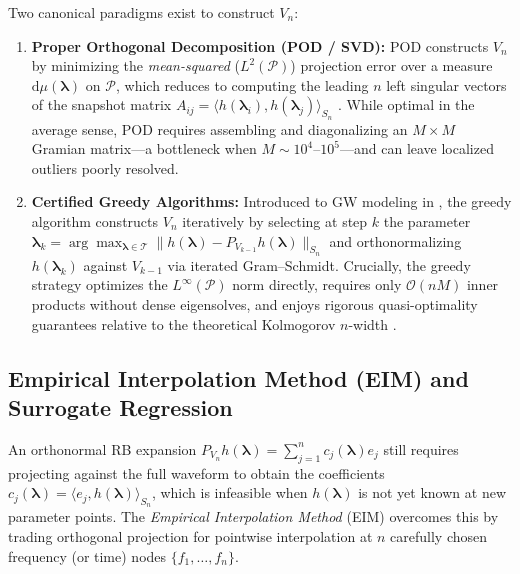 \documentclass[11pt, a4paper]{article}
\begin{document}
Two canonical paradigms exist to construct $V_n$:
\begin{enumerate}
    \item \textbf{Proper Orthogonal Decomposition (POD / SVD):} POD constructs $V_n$ by minimizing the \emph{mean-squared} ($L^2(\mathcal{P})$) projection error over a measure $\mathrm{d}\mu(\boldsymbol{\lambda})$ on $\mathcal{P}$, which reduces to computing the leading $n$ left singular vectors of the snapshot matrix $A_{ij} = \langle h(\boldsymbol{\lambda}_i), h(\boldsymbol{\lambda}_j) \rangle_{S_n}$ \cite{Berkooz1993}. While optimal in the average sense, POD requires assembling and diagonalizing an $M \times M$ Gramian matrix---a bottleneck when $M \sim 10^4$--$10^5$---and can leave localized outliers poorly resolved.
    \item \textbf{Certified Greedy Algorithms:} Introduced to GW modeling in \cite{Field2011,Caudill2012}, the greedy algorithm constructs $V_n$ iteratively by selecting at step $k$ the parameter $\boldsymbol{\lambda}_k = \arg\max_{\boldsymbol{\lambda} \in \mathcal{T}} \| h(\boldsymbol{\lambda}) - P_{V_{k-1}} h(\boldsymbol{\lambda}) \|_{S_n}$ and orthonormalizing $h(\boldsymbol{\lambda}_k)$ against $V_{k-1}$ via iterated Gram--Schmidt. Crucially, the greedy strategy optimizes the $L^\infty(\mathcal{P})$ norm directly, requires only $\mathcal{O}(n M)$ inner products without dense eigensolves, and enjoys rigorous quasi-optimality guarantees relative to the theoretical Kolmogorov $n$-width \cite{Binev2011,DeVore2013}.
\end{enumerate}

\subsection{Empirical Interpolation Method (EIM) and Surrogate Regression}

An orthonormal RB expansion $P_{V_n} h(\boldsymbol{\lambda}) = \sum_{j=1}^n c_j(\boldsymbol{\lambda}) e_j$ still requires projecting against the full waveform to obtain the coefficients $c_j(\boldsymbol{\lambda}) = \langle e_j, h(\boldsymbol{\lambda}) \rangle_{S_n}$, which is infeasible when $h(\boldsymbol{\lambda})$ is not yet known at new parameter points. The \emph{Empirical Interpolation Method} (EIM) \cite{Barrault2004,Maday2009} overcomes this by trading orthogonal projection for pointwise interpolation at $n$ carefully chosen frequency (or time) nodes $\{f_1, \dots, f_n\}$.
\end{document}

